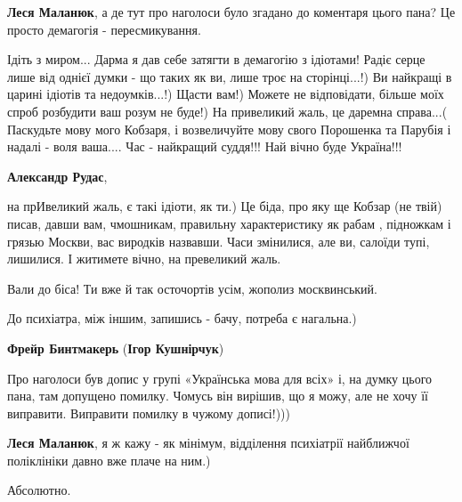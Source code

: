 \begin{itemize}
\begin{itemize}
\textbf{Леся Маланюк}, а де тут про наголоси було згадано до коментаря цього пана? Це просто демагогія - пересмикування.


\obeycr
Ідіть з миром...
Дарма я дав себе затягти в демагогію з ідіотами!
Радіє серце лише від однієї думки - що таких як ви, лише троє на сторінці...!)
Ви найкращі в царині ідіотів та недоумків...!)
Щасти вам!)
Можете не відповідати, більше моїх спроб розбудити ваш розум не буде!)
На привеликий жаль, це даремна справа...(
Паскудьте мову мого Кобзаря, і возвеличуйте мову свого Порошенка та Парубія і надалі - воля ваша....
Час - найкращий суддя!!!
Най вічно буде Україна!!!
\restorecr

\textbf{Александр Рудас}, 

на прИвеликий жаль, є такі ідіоти, як ти.) Це біда, про яку ще Кобзар (не твій)
писав, давши вам, чмошникам, правильну характеристику як рабам , підножкам і
грязью Москви, вас виродків назвавши. Часи змінилися, але ви, салоїди тупі,
лишилися. І житимете вічно, на превеликий жаль.

Вали до біса! Ти вже й так осточортів усім, жополиз москвинський.

До психіатра, між іншим, запишись - бачу, потреба є нагальна.)

\textbf{Фрейр Бинтмакерь} (\textbf{Ігор Кушнірчук}) 

Про наголоси був допис у групі «Українська мова для всіх» і, на думку цього
пана, там допущено помилку. Чомусь він вирішив, що я можу, але не хочу її
виправити. Виправити помилку в чужому дописі!)))

\textbf{Леся Маланюк}, я ж кажу - як мінімум, відділення психіатрії найближчої поліклініки давно вже плаче на ним.)

\end{itemize} %

Абсолютно.




\end{itemize} %
